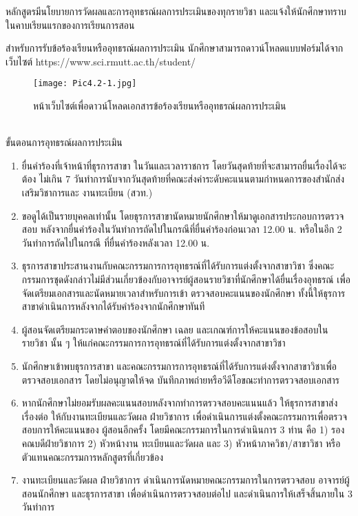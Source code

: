 \begin{doclist}
\end{doclist}


หลักสูตรมีนโยบายการวัดผลและการอุทธรณ์ผลการประเมินของทุกรายวิชา และแจ้งให้นักศึกษาทราบในคาบเรียนแรกของการเรียนการสอน

สำหรับการรับข้อร้องเรียนหรืออุทธรณ์ผลการประเมิน นักศึกษาสามารถดาวน์โหลดแบบฟอร์มได้จากเว็บไซต์ https://www.sci.rmutt.ac.th/student/ \\
\begin{figure}[h!]
		\texttt{[image: Pic4.2-1.jpg]}
		\caption{หน้าเว็บไซต์เพื่อดาวน์โหลดเอกสารข้อร้องเรียนหรืออุทธรณ์ผลการประเมิน}
\end{figure}
\\
\noindent
ขั้นตอนการอุทธรณ์ผลการประเมิน
\begin{enumerate}
\item ยื่นคำร้องที่เจ้าหน้าที่ธุรการสาขา ในวันและเวลาราชการ โดยวันสุดท้ายที่จะสามารถยื่นเรื่องได้จะต้อง
ไม่เกิน 7 วันทำการนับจากวันสุดท้ายที่คณะส่งค่าระดับคะแนนตามกำหนดการของสำนักส่งเสริมวิชาการและ
งานทะเบียน (สวท.)
\item ขอดูได้เป็นรายบุคคลเท่านั้น โดยธุรการสาขานัดหมายนักศึกษาให้มาดูเอกสารประกอบการตรวจสอบ
หลังจากยื่นคำร้องในวันทำการถัดไปในกรณีที่ยื่นคำร้องก่อนเวลา 12.00 น. หรือในอีก 2 วันทำการถัดไปในกรณี
ที่ยื่นคำร้องหลังเวลา 12.00 น.
\item ธุรการสาขาประสานงานกับคณะกรรมการการอุทธรณ์ที่ได้รับการแต่งตั้งจากสาขาวิชา ซึ่งคณะกรรมการชุดดังกล่าวไม่มีส่วนเกี่ยวข้องกับอาจารย์ผู้สอนรายวิชาที่นักศึกษาได้ยื่นเรื่องอุทธรณ์ เพื่อจัดเตรียมเอกสารและนัดหมายเวลาสำหรับการเข้า
ตรวจสอบคะแนนของนักศึกษา ทั้งนี้ให้ธุรการสาขาดำเนินการหลังจากได้รับคำร้องจากนักศึกษาทันที
\item ผู้สอนจัดเตรียมกระดาษคำตอบของนักศึกษา เฉลย และเกณฑ์การให้คะแนนของข้อสอบในรายวิชา
นั้น ๆ ให้แก่คณะกรรมการการอุทธรณ์ที่ได้รับการแต่งตั้งจากสาขาวิชา
\item นักศึกษาเข้าพบธุรการสาขา และคณะกรรมการการอุทธรณ์ที่ได้รับการแต่งตั้งจากสาขาวิชาเพื่อตรวจสอบเอกสาร โดยไม่อนุญาตให้จด บันทึกภาพถ่ายหรือวีดีโอขณะทำการตรวจสอบเอกสาร
\item หากนักศึกษาไม่ยอมรับผลคะแนนสอบหลังจากทำการตรวจสอบคะแนนแล้ว ให้ธุรการสาขาส่งเรื่องต่อ
ให้กับงานทะเบียนและวัดผล ฝ่ายวิชาการ เพื่อดำเนินการแต่งตั้งคณะกรรมการเพื่อตรวจสอบการให้คะแนนของ
ผู้สอนอีกครั้ง โดยมีคณะกรรมการในการดำเนินการ 3 ท่าน คือ 1) รองคณบดีฝ่ายวิชาการ 2) หัวหน้างาน
ทะเบียนและวัดผล และ 3) หัวหน้าภาควิชา/สาขาวิชา หรือตัวแทนคณะกรรมการหลักสูตรที่เกี่ยวข้อง
\item งานทะเบียนและวัดผล ฝ่ายวิชาการ ดำเนินการนัดหมายคณะกรรมการในการตรวจสอบ อาจารย์ผู้สอนนักศึกษา และธุรการสาขา เพื่อดำเนินการตรวจสอบต่อไป และดำเนินการให้เสร็จสิ้นภายใน 3 วันทำการ
\end{enumerate}

